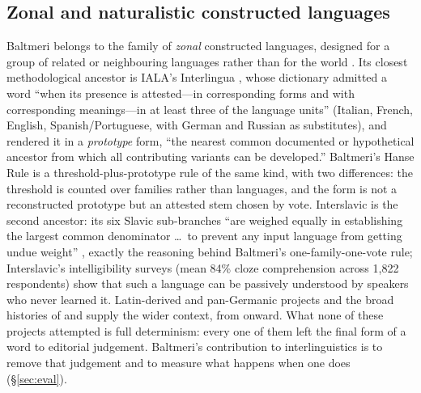 \subsection{Zonal and naturalistic constructed languages}\label{sec:related-conlang}
Baltmeri belongs to the family of \emph{zonal} constructed languages, designed for a group of related or neighbouring languages rather than for the world \citep{gobbo2020}. Its closest methodological ancestor is IALA's Interlingua \citep{iala1951}, whose dictionary admitted a word ``when its presence is attested---in corresponding forms and with corresponding meanings---in at least three of the language units'' (Italian, French, English, Spanish/Portuguese, with German and Russian as substitutes), and rendered it in a \emph{prototype} form, ``the nearest common documented or hypothetical ancestor from which all contributing variants can be developed.'' Baltmeri's Hanse Rule is a threshold-plus-prototype rule of the same kind, with two differences: the threshold is counted over families rather than languages, and the form is not a reconstructed prototype but an attested stem chosen by vote. Interslavic is the second ancestor: its six Slavic sub-branches ``are weighed equally in establishing the largest common denominator \ldots\ to prevent any input language from getting undue weight'' \citep{merunka2019,vansteenbergen2016}, exactly the reasoning behind Baltmeri's one-family-one-vote rule; Interslavic's intelligibility surveys (mean 84\% cloze comprehension across 1,822 respondents) show that such a language can be passively understood by speakers who never learned it. Latin-derived and pan-Germanic projects \citep{libert2004} and the broad histories of \citet{okrent2009} and \citet{peterson2015} supply the wider context, from \citet{zamenhof1887} onward. What none of these projects attempted is full determinism: every one of them left the final form of a word to editorial judgement. Baltmeri's contribution to interlinguistics is to remove that judgement and to measure what happens when one does (\S\ref{sec:eval}).

